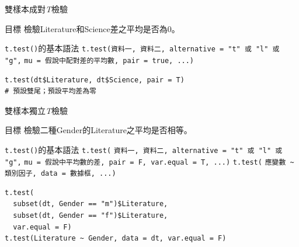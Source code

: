 \documentclass[12pt, aspectratio=43]{beamer}
\begin{document}
\begin{frame}[fragile]{雙樣本成對\emph{T}檢驗}
\begin{block}{目標}
檢驗Literature和Science差之平均是否為0。
\end{block}
\begin{block}{\texttt{t.test()}的基本語法}
\verb+t.test(資料一, 資料二, alternative = "t" 或 "l" 或 "g",+
\verb+mu = 假說中配對差的平均數, pair = true, ...)+
\end{block}
\begin{verbatim}
t.test(dt$Literature, dt$Science, pair = T)
# 預設雙尾；預設平均差為零
\end{verbatim}
\end{frame}


\begin{frame}[fragile]{雙樣本獨立\emph{T}檢驗}
\begin{block}{目標}
檢驗二種Gender的Literature之平均是否相等。
\end{block}
\begin{block}{\texttt{t.test()}的基本語法}
\verb+t.test(+
\verb+資料一, 資料二, alternative = "t" 或 "l" 或 "g",+
\verb+mu = 假說中平均數的差, pair = F, var.equal = T, ...)+
\verb+t.test(+
\verb+應變數 ~ 類別因子, data = 數據框, ...)+
\end{block}
\begin{verbatim}
t.test(
  subset(dt, Gender == "m")$Literature,
  subset(dt, Gender == "f")$Literature,
  var.equal = F)
t.test(Literature ~ Gender, data = dt, var.equal = F)
\end{verbatim}
\end{frame}
%
\end{document}
